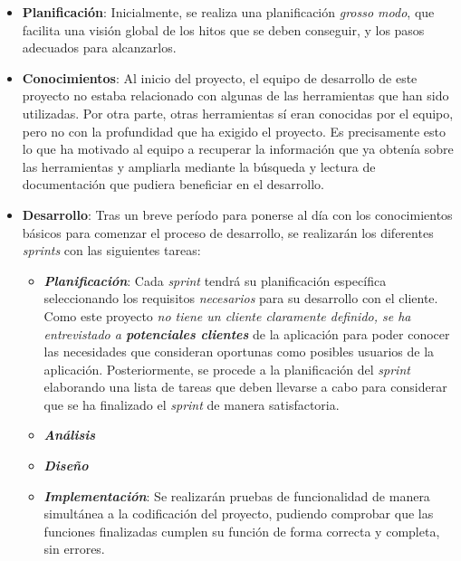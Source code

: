 \begin{itemize}
    \item \textbf{Planificación}: Inicialmente, se realiza una planificación \textit{grosso modo}, 
    que facilita una visión global de los hitos que se deben conseguir, y los 
    pasos adecuados para alcanzarlos.

    \item \textbf{Conocimientos}: Al inicio del proyecto, el equipo de desarrollo 
    de este proyecto no estaba relacionado con algunas de las herramientas que han sido 
    utilizadas. Por otra parte, otras herramientas sí eran conocidas por el equipo, pero 
    no con la profundidad que ha exigido el proyecto. Es precisamente esto lo que ha motivado 
    al equipo a recuperar la información que ya obtenía sobre las herramientas y ampliarla mediante 
    la búsqueda y lectura de documentación que pudiera beneficiar en el desarrollo.

    \item \textbf{Desarrollo}: Tras un breve período para ponerse al día con los 
    conocimientos básicos para comenzar el proceso de desarrollo, se realizarán los 
    diferentes \textit{sprints} con las siguientes tareas:
    
    \begin{itemize}
        \item \textbf{\textit{Planificación}}: Cada \textit{sprint} tendrá su 
        planificación específica seleccionando los requisitos \textit{necesarios} 
        para su desarrollo con el cliente. Como este proyecto \textit{no tiene un cliente claramente 
        definido, se ha entrevistado a \textbf{potenciales clientes}} de la aplicación 
        para poder conocer las necesidades que consideran oportunas como posibles 
        usuarios de la aplicación. Posteriormente, se procede a la planificación 
        del \textit{sprint} elaborando una lista de tareas que deben llevarse a 
        cabo para considerar que se ha finalizado el \textit{sprint} de manera
        satisfactoria.

        \item \textbf{\textit{Análisis}}
        \item \textbf{\textit{Diseño}}
        \item \textbf{\textit{Implementación}}: Se realizarán pruebas de funcionalidad 
        de manera simultánea a la codificación del proyecto, pudiendo comprobar que las 
        funciones finalizadas cumplen su función de forma correcta y completa, sin errores.


\end{itemize}
\end{itemize}
